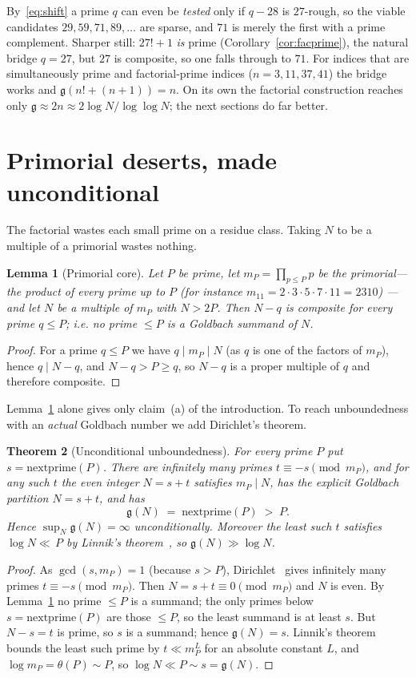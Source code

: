 \documentclass[11pt]{article}
\theoremstyle{plain}
\newtheorem{theorem}{Theorem}
\newtheorem{lemma}[theorem]{Lemma}
\theoremstyle{definition}
\theoremstyle{remark}
\newcommand{\N}{N}
\newcommand{\g}{\mathfrak{g}}
\begin{document}
By~\eqref{eq:shift} a prime $q$ can even be \emph{tested} only if $q-28$ is
$27$-rough, so the viable candidates $29,59,71,89,\dots$ are sparse, and $71$ is
merely the first with a prime complement. Sharper still: $27!+1$ \emph{is} prime
(Corollary~\ref{cor:facprime}), the natural bridge $q=27$, but $27$ is composite,
so one falls through to $71$. For indices that are simultaneously prime and
factorial-prime indices ($n=3,11,37,41$) the bridge works and
$\g(n!+(n+1))=n$. On its own the factorial construction reaches only
$\g\approx2n\approx2\log\N/\log\log\N$; the next sections do far better.

\section{Primorial deserts, made unconditional}\label{sec:primorial}

The factorial wastes each small prime on a residue class. Taking $\N$ to be a
multiple of a primorial wastes nothing.

\begin{lemma}[Primorial core]\label{lem:primcore}
Let $P$ be prime, let $m_P=\prod_{p\le P}p$ be the \emph{primorial}---the product
of every prime up to $P$ (for instance $m_{11}=2\cdot3\cdot5\cdot7\cdot11=2310$)
---and let $\N$ be a multiple of $m_P$ with $\N>2P$. Then $\N-q$ is composite for
every prime $q\le P$; i.e. no prime $\le P$ is a Goldbach summand of $\N$.
\end{lemma}
\begin{proof}
For a prime $q\le P$ we have $q\mid m_P\mid\N$ (as $q$ is one of the factors of
$m_P$), hence $q\mid\N-q$, and $\N-q>P\ge q$, so $\N-q$ is a proper multiple of
$q$ and therefore composite.
\end{proof}

Lemma~\ref{lem:primcore} alone gives only claim~(a) of the introduction. To reach
unboundedness with an \emph{actual} Goldbach number we add Dirichlet's theorem.

\begin{theorem}[Unconditional unboundedness]\label{thm:dirichlet}
For every prime $P$ put $s=\mathrm{nextprime}(P)$. There are infinitely many
primes $t\equiv-s\pmod{m_P}$, and for any such $t$ the even integer $\N=s+t$
satisfies $m_P\mid\N$, has the explicit Goldbach partition $\N=s+t$, and has
\[
\g(\N)\;=\;\mathrm{nextprime}(P)\;>\;P.
\]
Hence $\sup_\N\g(\N)=\infty$ unconditionally. Moreover the least such $t$
satisfies $\log\N\ll_{\,}P$ by Linnik's theorem~\cite{Linnik}, so
$\g(\N)\gg\log \N$.
\end{theorem}
\begin{proof}
As $\gcd(s,m_P)=1$ (because $s>P$), Dirichlet~\cite{Dirichlet} gives infinitely
many primes $t\equiv-s\pmod{m_P}$. Then $\N=s+t\equiv0\pmod{m_P}$ and $\N$ is
even. By Lemma~\ref{lem:primcore} no prime $\le P$ is a summand; the only primes
below $s=\mathrm{nextprime}(P)$ are those $\le P$, so the least summand is at
least $s$. But $\N-s=t$ is prime, so $s$ is a summand; hence $\g(\N)=s$. Linnik's
theorem bounds the least such prime by $t\ll m_P^{L}$ for an absolute constant
$L$, and $\log m_P=\theta(P)\sim P$, so $\log\N\ll P\sim s=\g(\N)$.
\end{proof}
\end{document}
